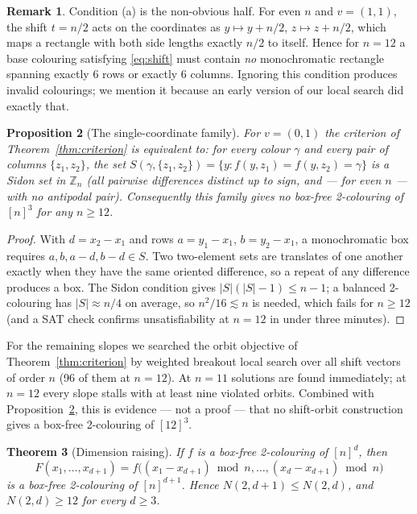 \documentclass[11pt]{article}
\newtheorem{theorem}{Theorem}
\newtheorem{proposition}[theorem]{Proposition}
\theoremstyle{definition}
\newtheorem{remark}[theorem]{Remark}
\begin{document}
\begin{remark}
Condition (a) is the non-obvious half. For even $n$ and $v=(1,1)$, the shift $t=n/2$
acts on the coordinates as $y\mapsto y+n/2$, $z\mapsto z+n/2$, which maps a rectangle
with both side lengths exactly $n/2$ to itself. Hence for $n=12$ a base colouring
satisfying \eqref{eq:shift} must contain \emph{no} monochromatic rectangle spanning
exactly $6$ rows or exactly $6$ columns. Ignoring this condition produces invalid
colourings; we mention it because an early version of our local search did exactly that.
\end{remark}

\begin{proposition}[The single-coordinate family]\label{prop:sidon}
For $v=(0,1)$ the criterion of Theorem~\ref{thm:criterion} is equivalent to: for every
colour $\gamma$ and every pair of columns $\{z_1,z_2\}$, the set
$S(\gamma,\{z_1,z_2\})=\{y : f(y,z_1)=f(y,z_2)=\gamma\}$ is a Sidon set in
$\mathbb{Z}_n$ (all pairwise differences distinct up to sign, and --- for even $n$ ---
with no antipodal pair). Consequently this family gives no box-free 2-colouring of
$[n]^3$ for any $n\ge 12$.
\end{proposition}

\begin{proof}
With $d=x_2-x_1$ and rows $a=y_1-x_1$, $b=y_2-x_1$, a monochromatic box requires
$a,b,a-d,b-d\in S$. Two two-element sets are translates of one another exactly when they
have the same oriented difference, so a repeat of any difference produces a box. The
Sidon condition gives $|S|(|S|-1)\le n-1$; a balanced 2-colouring has $|S|\approx n/4$ on
average, so $n^2/16\lesssim n$ is needed, which fails for $n\ge 12$ (and a SAT check
confirms unsatisfiability at $n=12$ in under three minutes).
\end{proof}

For the remaining slopes we searched the orbit objective of Theorem~\ref{thm:criterion}
by weighted breakout local search over all shift vectors of order $n$ (96 of them at $n=12$). At
$n=11$ solutions are found immediately; at $n=12$ every slope stalls with at least nine
violated orbits. Combined with Proposition~\ref{prop:sidon}, this is evidence --- not a
proof --- that no shift-orbit construction gives a box-free 2-colouring of $[12]^3$.

\begin{theorem}[Dimension raising]\label{thm:raise}
If $f$ is a box-free 2-colouring of $[n]^d$, then
\[
F(x_1,\dots,x_{d+1})=f\big((x_1-x_{d+1})\bmod n,\dots,(x_d-x_{d+1})\bmod n\big)
\]
is a box-free 2-colouring of $[n]^{d+1}$. Hence $N(2,d+1)\le N(2,d)$, and $N(2,d)\ge12$
for every $d\ge3$.
\end{theorem}
\end{document}

